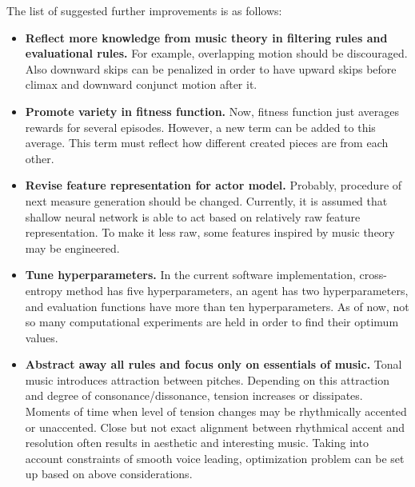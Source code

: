 \documentclass{article}
\begin{document}
The list of suggested further improvements is as follows:
\begin{itemize}
	\item \textbf{Reflect more knowledge from music theory in filtering rules and evaluational rules.} For example, overlapping motion should be discouraged. Also downward skips can be penalized in order to have upward skips before climax and downward conjunct motion after it.
	\item \textbf{Promote variety in fitness function.} Now, fitness function just averages rewards for several episodes. However, a new term can be added to this average. This term must reflect how different created pieces are from each other.
	\item \textbf{Revise feature representation for actor model.} Probably, procedure of next measure generation should be changed. Currently, it is assumed that shallow neural network is able to act based on relatively raw feature representation. To make it less raw, some features inspired by music theory may be engineered.
	\item \textbf{Tune hyperparameters.} In the current software implementation, cross-entropy method has five hyperparameters, an agent has two hyperparameters, and evaluation functions have more than ten hyperparameters. As of now, not so many computational experiments are held in order to find their optimum values. 
	\item \textbf{Abstract away all rules and focus only on essentials of music.} Tonal music introduces attraction between pitches. Depending on this attraction and degree of consonance/dissonance, tension increases or dissipates. Moments of time when level of tension changes may be rhythmically accented or unaccented. Close but not exact alignment between rhythmical accent and resolution often results in aesthetic and interesting music. Taking into account constraints of smooth voice leading, optimization problem can be set up based on above considerations.
\end{itemize}


  

\end{document}
